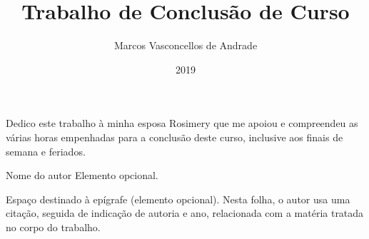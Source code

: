 \documentclass[tsi]{ifbclass/ifbclass}
\title{Trabalho de Conclusão de Curso}
\date{2019}
\author{Marcos Vasconcellos de Andrade}
\begin{document}
\frontmatter

\frontpage

\presentationpage

\begin{fichacatalografica}
  \FakeFichaCatalografica
\end{fichacatalografica}

\banca

\begin{dedicatory} %
Dedico este trabalho à minha esposa Rosimery que me apoiou e compreendeu as
várias horas empenhadas para a conclusão deste curso, inclusive aos finais
de semana e feriados.
\end{dedicatory}
  
\acknowledgements %


\begin{epigraph}[]{Nome do autor} %
Elemento opcional.

Espaço destinado à epígrafe (elemento opcional). Nesta folha, o autor usa uma
citação, seguida de indicação de autoria e ano, relacionada com a matéria
tratada no corpo do trabalho.
\end{epigraph}

\resumo
{\parindent0pt
  
}
  
\abstract
{\parindent0pt
  
}

\listoffigures

\lstlistoflistings

\listoftables

\listofacronyms


\tableofcontents

\mainmatter








\begin{references}
  
\end{references}


\theappendix

\end{document}
